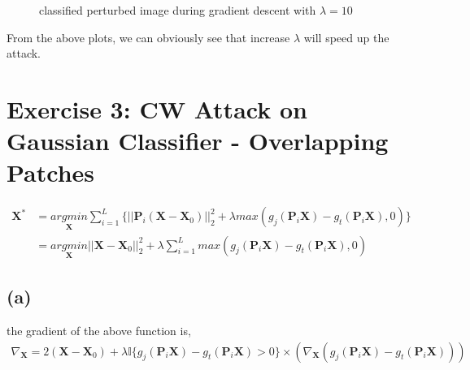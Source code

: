 \documentclass[11pt]{article}
\begin{document}
\begin{figure}[h]
	\centering
	\caption{classified perturbed image during gradient descent with $\lambda = 10$}
\end{figure}

From the above plots, we can obviously see that increase $\lambda$ will speed up the attack. 
\pagebreak
\section*{Exercise 3: CW Attack on Gaussian Classifier - Overlapping Patches}
\begin{equation}
\begin{split}
\pmb{X}^*&=\underset{\pmb{X}}{argmin}\sum_{i=1}^{L}\{||\pmb{P}_i(\pmb{X}-\pmb{X}_0)||^2_2+\lambda max(g_j(\pmb{P}_i\pmb{X})-g_t(\pmb{P}_i\pmb{X}),0)\}\\
&=\underset{\pmb{X}}{argmin}||\pmb{X}-\pmb{X}_0||^2_2+\lambda\sum_{i=1}^{L}max(g_j(\pmb{P}_i\pmb{X})-g_t(\pmb{P}_i\pmb{X}),0)
\end{split}
\end{equation}
\subsection*{(a)} the gradient of the above function is,
\begin{equation}
\begin{split}
\nabla_{\pmb{X}}=2(\pmb{X}-\pmb{X}_0)+\lambda\mathbb{I}\{g_j(\pmb{P}_i\pmb{X})-g_t(\pmb{P}_i\pmb{X})>0\}\times(\nabla_{\pmb{X}}(g_j(\pmb{P}_i\pmb{X})-g_t(\pmb{P}_i\pmb{X})))
\end{split}
\end{equation} 
\end{document}
